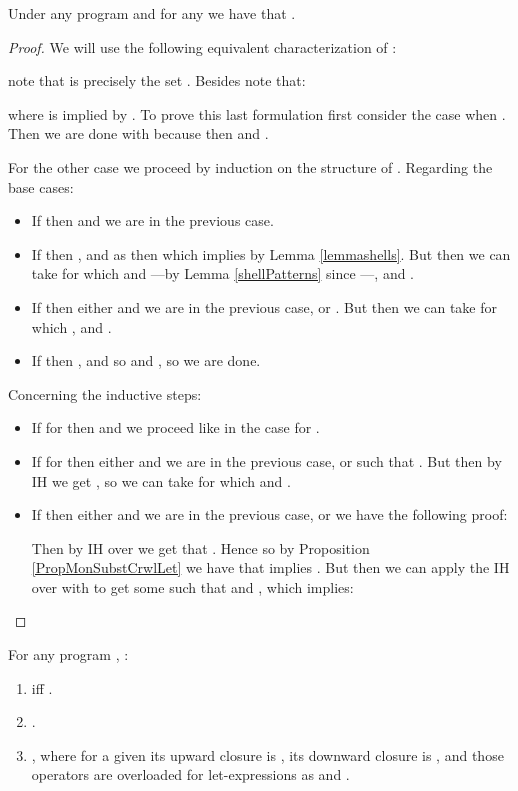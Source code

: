 \begin{lemma}\label{LemEx2iii}
Under any program  and for any  we have that .
\end{lemma}
\begin{proof}
We will use the following equivalent characterization of :

note that  is precisely the set . Besides note that:

where  is implied by . To prove this last formulation first consider the case when . Then we are done with  because then  and .

For the other case we proceed by induction on the structure of . Regarding the base cases:
\begin{itemize}
    \item If  then  and we are in the previous case.
    \item If  then , and as  then  which implies  by Lemma \ref{lemmashells}. But then we can take  for which  and  ---by Lemma \ref{shellPatterns} since ---, and .
    \item If  then either  and we are in the previous case, or . But then we can take  for which , and .
    \item If  then , and so  and , so we are done.
\end{itemize}
Concerning the inductive steps:
\begin{itemize}
    \item If  for  then  and we proceed like in the case for .
    \item If  for  then either  and we are in the previous case, or  such that . But then by IH we get , so we can take  for which  and .
    \item If  then either  and we are in the previous case, or we have the following proof:


Then by IH over  we get that . Hence  so by Proposition \ref{PropMonSubstCrwlLet} we have that  implies . But then we can apply the IH over  with  to get some  such that  and , which implies:





\end{itemize}
\end{proof}

For any program  , :
  \begin{enumerate}
  \item  iff .
  \item .
  \item , where for a given  its upward closure is , its downward closure is , and those operators are overloaded for let-expressions as  and .
\end{enumerate}

